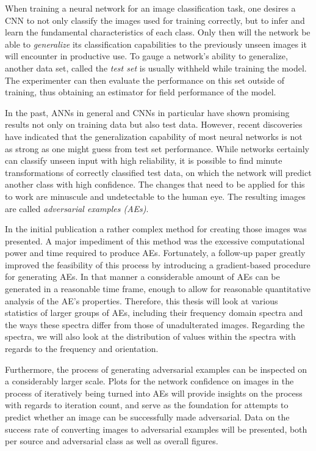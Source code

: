 \documentclass[11pt, a4paper]{article}
\begin{document}
When training a neural network for an image classification task, one desires a CNN to not only classify the images used for training correctly, but to infer and learn the fundamental characteristics of each class. Only then will the network be able to \emph{generalize} its classification capabilities to the previously unseen images it will encounter in productive use. To gauge a network's ability to generalize, another data set, called the \emph{test set} is usually withheld while training the model. The experimenter can then evaluate the performance on this set outside of training, thus obtaining an estimator for field performance of the model.

In the past, ANNs in general and CNNs in particular have shown promising results not only on training data but also test data. However, recent discoveries have indicated that the generalization capability of most neural networks is not as strong as one might guess from test set performance. While networks certainly can classify unseen input with high reliability, it is possible to find minute transformations of correctly classified test data, on which the network will predict another class with high confidence. The changes that need to be applied for this to work are minuscule and undetectable to the human eye. The resulting images are called \emph{adversarial examples (AEs)}.

In the initial publication a rather complex method for creating those images was presented. A major impediment of this method was the excessive computational power and time required to produce AEs. Fortunately, a follow-up paper greatly improved the feasibility of this process by introducing a gradient-based procedure for generating AEs. In that manner a considerable amount of AEs can be generated in a reasonable time frame, enough to allow for reasonable quantitative analysis of the AE's properties. Therefore, this thesis will look at various statistics of larger groups of AEs, including their frequency domain spectra and the ways these spectra differ from those of unadulterated images. Regarding the spectra, we will also look at the distribution of values within the spectra with regards to the frequency and orientation.

Furthermore, the process of generating adversarial examples can be inspected on a considerably larger scale. Plots for the network confidence on images in the process of iteratively being turned into AEs will provide insights on the process with regards to iteration count, and serve as the foundation for attempts to predict whether an image can be successfully made adversarial. Data on the success rate of converting images to adversarial examples will be presented, both per source and adversarial class as well as overall figures.
\end{document}
